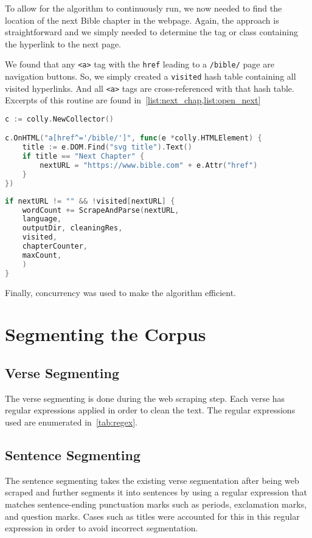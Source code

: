 \documentclass{article}
\begin{document}
To allow for the algorithm to continuously run, we now needed to find the
location of the next Bible chapter in the webpage. Again, the approach is
straightforward and we simply needed to determine the tag or class containing
the hyperlink to the next page.

We found that any \texttt{<a>} tag with the \texttt{href} leading to a
\texttt{/bible/} page are navigation buttons. So, we simply created a
\texttt{visited} hash table containing all visited hyperlinks. And all
\texttt{<a>} tags are cross-referenced with that hash table. Excerpts of this
routine are found in~\cref{list:next_chap,list:open_next}

\begin{lstlisting}[language=Go, caption={Finding the next chapter using the HTML tags}, label={list:next_chap}]
c := colly.NewCollector()

c.OnHTML("a[href^='/bible/']", func(e *colly.HTMLElement) {
    title := e.DOM.Find("svg title").Text()
    if title == "Next Chapter" {
        nextURL = "https://www.bible.com" + e.Attr("href")
    }
})    
\end{lstlisting}

\begin{lstlisting}[language=Go, caption={Opening the next chapter}, label={list:open_next}]
if nextURL != "" && !visited[nextURL] {
    wordCount += ScrapeAndParse(nextURL,
    language,
    outputDir, cleaningRes,
    visited,
    chapterCounter,
    maxCount,
    )
}
\end{lstlisting}

Finally, concurrency was used to make the algorithm efficient.

\section{Segmenting the Corpus}

\subsection{Verse Segmenting}
The verse segmenting is done during the web scraping step. Each verse has
regular expressions applied in order to clean the text. The regular expressions
used are enumerated in~\cref{tab:regex}.

\subsection{Sentence Segmenting}
The sentence segmenting takes the existing verse segmentation after being web
scraped and further segments it into sentences by using a regular expression
that matches sentence-ending punctuation marks such as periods, exclamation
marks, and question marks. Cases such as titles were accounted for this in this
regular expression in order to avoid incorrect segmentation.
\end{document}
